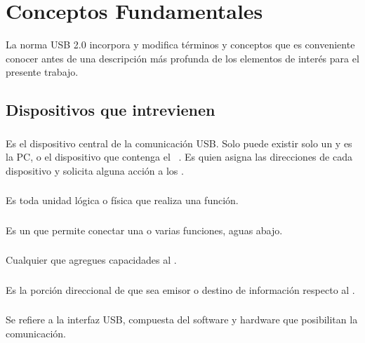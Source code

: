   \section{Conceptos Fundamentales}
  La norma USB 2.0 incorpora y modifica términos y conceptos que es conveniente
  conocer antes de una descripción más profunda de los elementos de interés para
  el presente trabajo.
    \subsection{Dispositivos que intrevienen}
      \subsubsection{\host}
      Es el dispositivo central de la comunicación USB. Solo puede existir solo
      un \host y es la PC, o el dispositivo que contenga el \host~\controller.
      Es quien asigna las direcciones de cada dispositivo y solicita alguna
      acción a los \devices.

      \subsubsection{\device}
      Es toda unidad lógica o física que realiza una función.

      \subsubsection{\hub}
      Es un \device que permite conectar una o varias funciones, aguas abajo.

      \subsubsection{\function}
      Cualquier \device que agregues capacidades al \host.

      \subsubsection{\ep}
      Es la porción direccional de \device que sea emisor o destino de
      información respecto al \host.

      \subsubsection{\controller}Se refiere a la interfaz USB, compuesta del
      software y hardware que posibilitan la comunicación.

